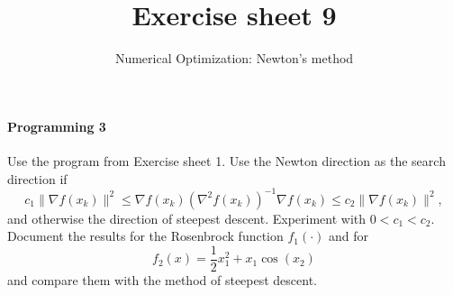 
\title{Exercise sheet 9}
\subtitle{Numerical Optimization: Newton's method}
\usepackage{amsmath}
\newcommand\tp{\ensuremath{\text{\upshape T}}}

\maketitle

\paragraph{Programming 3}
Use the program from Exercise sheet 1. Use the Newton direction as the search
direction if
\[
c_1 \|\nabla f(x_k)\|^2
\le \nabla f(x_k)(\nabla^2 f(x_k))^{-1} \nabla f(x_k)
\le c_2 \|\nabla f(x_k)\|^2,
\]
and otherwise the direction of steepest descent. Experiment with $0<c_1<c_2$.
Document the results for the Rosenbrock function $f_1(\cdot)$ and for
\[
f_2(x) = \frac{1}{2}x_1^2 + x_1\cos(x_2)
\]
and compare them with the method of steepest descent.


